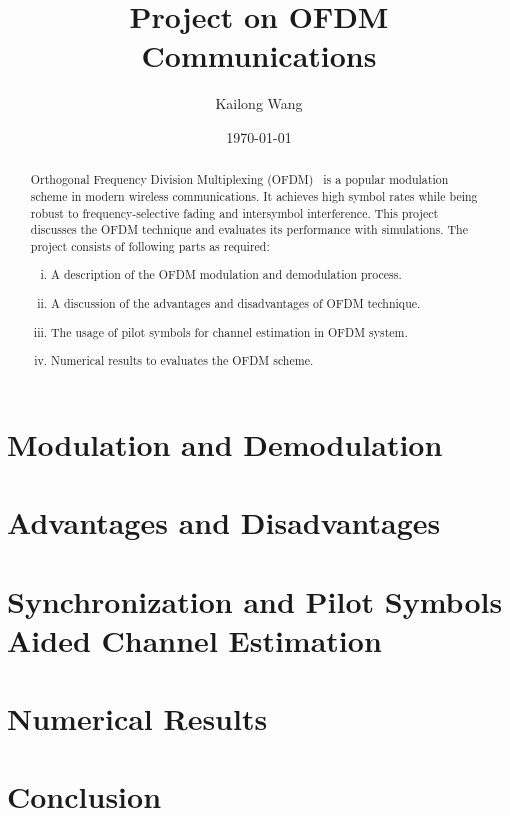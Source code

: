 \documentclass{article}
\title{Project on OFDM Communications}
\author{Kailong Wang}
\date{\today}
\begin{document}
\maketitle

\begin{abstract}
    Orthogonal Frequency Division Multiplexing (OFDM)~\cite{5307460} is a popular modulation scheme in modern wireless communications. It achieves high symbol rates while being robust to frequency-selective fading and intersymbol interference. This project discusses the OFDM technique and evaluates its performance with simulations. The project consists of following parts as required:
    \begin{enumerate}[(i)]
        \item A description of the OFDM modulation and demodulation process.
        \item A discussion of the advantages and disadvantages of OFDM technique.
        \item The usage of pilot symbols for channel estimation in OFDM system.
        \item Numerical results to evaluates the OFDM scheme.
    \end{enumerate}
\end{abstract}

\section{Modulation and Demodulation}
\label{sec:modulation}


\section{Advantages and Disadvantages}


\section{Synchronization and Pilot Symbols Aided Channel Estimation}


\section{Numerical Results}


\section{Conclusion}

\clearpage
\printbibliography
\end{document}
